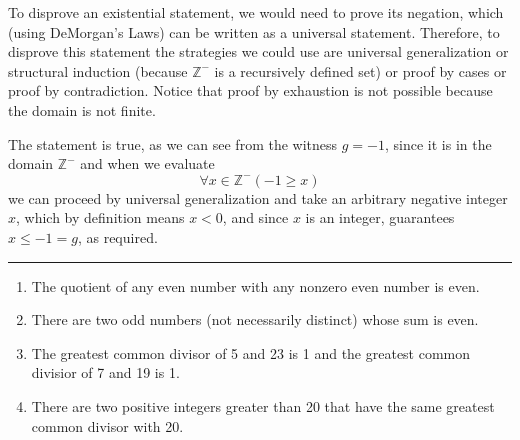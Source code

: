 \begin{enumerate}[labelindent=0pt, leftmargin=0pt]
    To disprove an existential statement, we would need to prove its negation, which (using DeMorgan's Laws) can be 
    written as a universal statement. Therefore, to disprove this statement the strategies we could use are 
    universal generalization or structural induction (because $\mathbb{Z}^{-}$ is a recursively defined set) or 
    proof by cases or proof by contradiction. Notice that proof by exhaustion is not possible because the domain is not finite.

    The statement is true, as we can see from the witness $g = -1$, since it is in the domain $\mathbb{Z}^{-}$ and when we evaluate
    \[
        \forall x \in \mathbb{Z}^{-} ( -1 \geq x)
    \]
    we can proceed by universal generalization and take an arbitrary negative integer $x$, which by definition means $x < 0$, 
    and since $x$ is an integer, guarantees $x \leq -1 = g$, as required.
    \rule{0.5\textwidth}{.4pt}

        \begin{enumerate}
            \item The quotient of any even number with any nonzero even number is even.
            \item There are two odd numbers (not necessarily distinct) whose sum is even.
            \item The greatest common divisor of 5 and 23 is 1 and the greatest common divisior of 7 and 19 is 1.
            \item There are two positive integers greater than 20 that have the same greatest common divisor with 20.
        \end{enumerate}
\end{enumerate}

